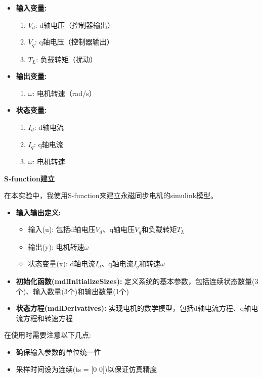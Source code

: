 \documentclass[12pt,a4paper,UTF8]{article}
\begin{document}
\begin{itemize}
    \item \textbf{输入变量:}
    \begin{enumerate}
        \item $V_d$: d轴电压（控制器输出）
        \item $V_q$: q轴电压（控制器输出）
        \item $T_L$: 负载转矩（扰动）
    \end{enumerate}
    \item \textbf{输出变量:}
    \begin{enumerate}
        \item $\omega$: 电机转速（rad/s）
    \end{enumerate}
    \item \textbf{状态变量:}
    \begin{enumerate}
        \item $I_d$: d轴电流
        \item $I_q$: q轴电流
        \item $\omega$: 电机转速
    \end{enumerate}
\end{itemize}

\textbf{S-function建立}

在本实验中，我使用S-function来建立永磁同步电机的simulink模型。

\begin{itemize}
\item \textbf{输入输出定义:} 
  \begin{itemize}
    \item 输入(u): 包括d轴电压$V_d$、q轴电压$V_q$和负载转矩$T_L$
    \item 输出(y): 电机转速$\omega$
    \item 状态变量(x): d轴电流$I_d$、q轴电流$I_q$和转速$\omega$
  \end{itemize}
\item \textbf{初始化函数(mdlInitializeSizes):} 定义系统的基本参数，包括连续状态数量(3个)、输入数量(3个)和输出数量(1个)
\item \textbf{状态方程(mdlDerivatives):} 实现电机的数学模型，包括d轴电流方程、q轴电流方程和转速方程
\end{itemize}

在使用时需要注意以下几点:
\begin{itemize}
\item 确保输入参数的单位统一性
\item 采样时间设为连续(ts = [0 0])以保证仿真精度
\end{itemize}
\end{document}
